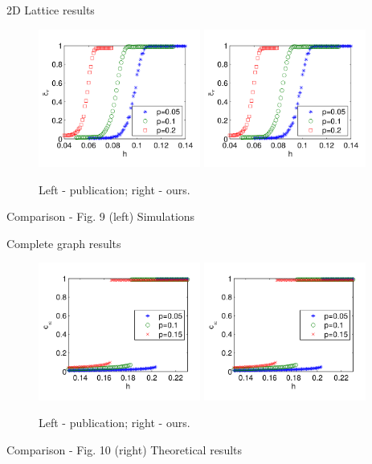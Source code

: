\documentclass[10pt]{beamer}
\begin{document}
\begin{frame}{2D Lattice results}
	\begin{figure}
		\includegraphics[width=0.475\textwidth]{../resources/images/fig9-left.png}
		\hfill
		\includegraphics[width=0.475\textwidth]{../resources/images/fig9-left.png}
		\caption{Left - publication; right - ours.}
	\end{figure}
	Comparison - Fig. 9 (left)
	Simulations
\end{frame}

\begin{frame}{Complete graph results}
	\begin{figure}
		\includegraphics[width=0.475\textwidth]{../resources/images/fig10-right.png}
		\hfill
		\includegraphics[width=0.475\textwidth]{../resources/images/fig10-right.png}
		\caption{Left - publication; right - ours.}
	\end{figure}
	Comparison - Fig. 10 (right)
	Theoretical results
\end{frame}
\end{document}
